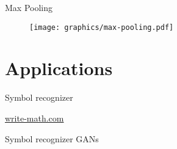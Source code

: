 \documentclass{beamer}
\begin{document}
\begin{frame}{Max Pooling}
\begin{figure}[ht]
    \centering
    \texttt{[image: graphics/max-pooling.pdf]}
\end{figure}
\end{frame}

\section{Applications}
\begin{frame}{Symbol recognizer}
    \begin{center}
        \href{http://write-math.com}{write-math.com}
    \end{center}
\end{frame}

\begin{frame}{Symbol recognizer}
GANs
\end{frame}
\end{document}
